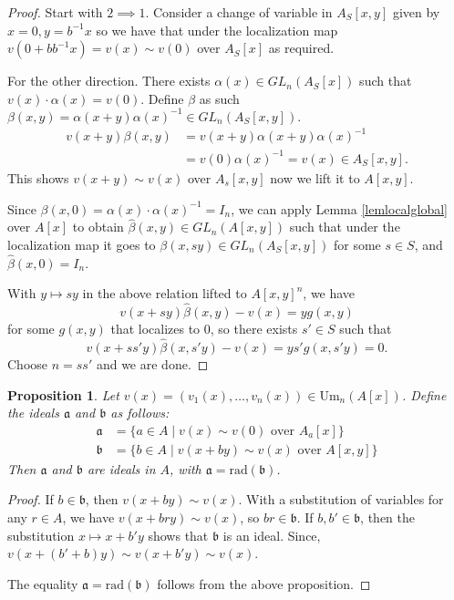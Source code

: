 \documentclass[12pt]{report}
\numberwithin{equation}{section}
\newcounter{dummy} \numberwithin{dummy}{section}
\newtheorem{proposition}[dummy]{Proposition}
\begin{document}
	\begin{proof}
	Start with $2 \implies 1$. Consider a change of variable in $A_S[x,y]$ given by $x=0, y=b^{-1}x$ so we have that under the localization map $v(0+b b^{-1}x ) = v(x) \sim v(0) $ over $A_S[x]$ as required.
	
	For the other direction.
	There exists \( \alpha(x) \in GL_n(A_S[x]) \) such that \( v(x) \cdot \alpha(x) = v(0) \). Define $\beta$ as such  
	\(
	\beta(x, y) = \alpha(x + y) \alpha(x)^{-1} \in GL_n(A_S[x, y]).
	\)
	\begin{align*}
			v(x + y)  \beta(x, y) &= v(x + y)  \alpha(x + y)  \alpha(x)^{-1}\\
			&=v(0) \alpha(x)^{-1} = v(x) \in A_S[x,y].
	\end{align*}
	This shows $v(x+y) \sim v(x) $ over $A_s[x,y]$ now we lift it to $A[x,y]$.
	
	Since \( \beta(x, 0) = \alpha(x) \cdot \alpha(x)^{-1} = I_n \), we can apply Lemma \ref{lemlocalglobal} over \( A[x] \) to obtain \( \hat{\beta}(x, y) \in GL_n(A[x, y]) \) such that under the localization map it goes to \( \beta(x, sy) \in GL_n(A_S[x,y])\) for some \( s \in S \), and \( \hat{\beta}(x, 0) = I_n \). 
	
	With $y\mapsto sy$ in the above relation lifted to \( A[x, y]^n \), we have  
	\[
	v(x + sy)  \hat{\beta}(x, y) - v(x) = y  g(x, y)
	\]
	for some \( g(x, y) \) that localizes to 0, so there exists \( s' \in S \) such that 
	\[
	v(x + ss'y) \hat{\beta}(x, s'y) - v(x) = y  s' g(x, s'y) = 0.
	\]
	Choose $n=ss' $ and we are done.
	\end{proof}
		
	\begin{proposition}
		Let $v(x) = (v_1(x), \dots, v_n(x)) \in \mathrm{Um}_n(A[x])$. Define the ideals $\mathfrak{a}$ and $\mathfrak{b}$ as follows:
		\begin{align*} \mathfrak{a} &= \{a \in A \mid v(x) \sim v(0) \text{ over } A_a[x] \} \\ \mathfrak{b} &= \{b \in A \mid v(x + by) \sim v(x) \text{ over } A[x, y] \} \end{align*} 
		Then $\mathfrak{a}$ and $\mathfrak{b}$ are ideals in $A$, with $\mathfrak{a} = \text{rad}(\mathfrak{b})$.
	\end{proposition}
	
	\begin{proof}
		If $b \in \mathfrak{b}$, then $v(x + by) \sim v(x)$.  With a substitution of variables for any $r \in A$, we have $v(x +bry) \sim v(x)$, so $br \in \mathfrak{b}$.  If $b, b' \in \mathfrak{b}$, then the substitution $x \mapsto x+b'y$ shows that $\mathfrak{b}$ is an ideal. Since, $ v(x+(b'+b)y) \sim v(x+b'y) \sim v(x)$.
		
		 The equality $\mathfrak{a} = \text{rad}(\mathfrak{b})$ follows from the above proposition.
	\end{proof}
	
\end{document}
